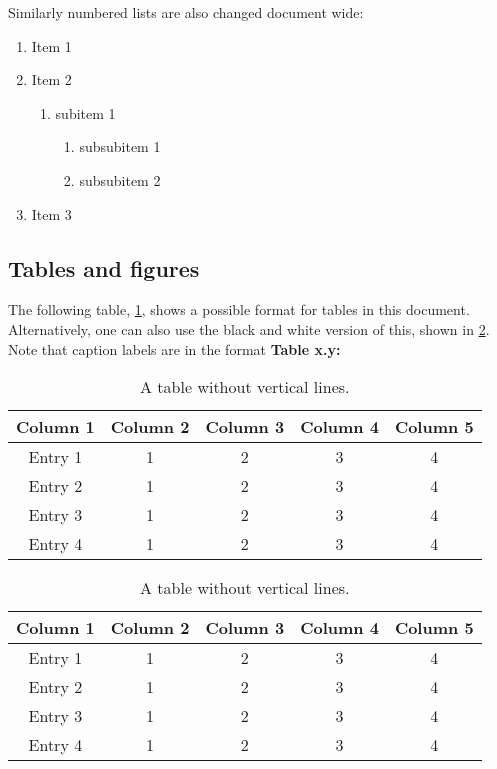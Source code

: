 Similarly numbered lists are also changed document wide:

\begin{enumerate}
    \item Item 1
    \item Item 2
    \begin{enumerate}
        \item subitem 1
        \begin{enumerate}
            \item subsubitem 1
            \item subsubitem 2
        \end{enumerate}
    \end{enumerate}
    \item Item 3
\end{enumerate}

\newpage

\subsection{Tables and figures}
The following table, \cref{table: style 1}, shows a possible format for tables in this document. Alternatively, one can also use the black and white version of this, shown in \cref{table: style 2}. Note that caption labels are in the format \textbf{\textcolor{EAFIT-blue}{Table x.y:} }
\begin{table}[ht]
\centering
\caption{A table without vertical lines.}
\begin{tabular}[t]{ccccc}
\toprule
\color{EAFIT-blue}\textbf{Column 1}&\color{EAFIT-blue}\textbf{Column 2}&\color{EAFIT-blue}\textbf{Column 3}&\color{EAFIT-blue}\textbf{Column 4}&\color{EAFIT-blue}\textbf{Column 5}\\
\midrule
Entry 1&1&2&3&4\\
Entry 2&1&2&3&4\\
Entry 3&1&2&3&4\\
Entry 4&1&2&3&4\\
\bottomrule
\end{tabular}
\label{table: style 1}
\end{table}

\begin{table}[ht]
\centering
\caption{A table without vertical lines.}
\begin{tabular}[t]{ccccc}
\toprule
\textbf{Column 1}&\textbf{Column 2}&\textbf{Column 3}&\textbf{Column 4}&\textbf{Column 5}\\
\midrule
Entry 1&1&2&3&4\\
Entry 2&1&2&3&4\\
Entry 3&1&2&3&4\\
Entry 4&1&2&3&4\\
\bottomrule
\end{tabular}
\label{table: style 2}
\end{table}

